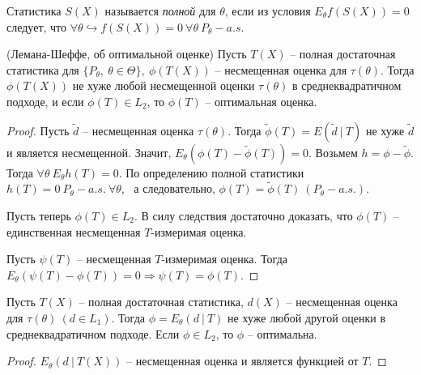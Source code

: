 \begin{definition}
    Статистика $S(X)$ называется \textit{полной} для $\theta$, если из условия $E_\theta f(S(X)) = 0$ следует, что $\forall \theta \hookrightarrow f(S(X)) = 0\ \forall \theta\ P_\theta-a.s.$
\end{definition}
\begin{theorem}
    (Лемана-Шеффе, об оптимальной оценке) Пусть $\displaystyle T( X)$ -- полная достаточная статистика для $\displaystyle \{P_{\theta } ,\ \theta \in \Theta \} ,\ \phi ( T( X))$ -- несмещенная оценка для $\displaystyle \tau ( \theta )$. Тогда $\displaystyle \phi ( T( X))$ не хуже любой несмещенной оценки $\displaystyle \tau ( \theta )$ в среднеквадратичном подходе, и если $\displaystyle \phi ( T) \in L_{2}$, то $\displaystyle \phi ( T)$ -- оптимальная оценка.
\end{theorem}
\begin{proof}
    Пусть $\displaystyle \tilde{d}$ -- несмещенная оценка $\displaystyle \tau ( \theta )$. Тогда $\displaystyle \tilde{\phi }( T) =E\left(\tilde{d} \ |\ T\right)$ не хуже $\displaystyle \tilde{d}$ и является несмещенной. Значит, $\displaystyle E_{\theta }\left( \phi ( T) -\tilde{\phi }( T)\right) =0$. Возьмем $\displaystyle h=\phi -\tilde{\phi }$. Тогда $\displaystyle \forall \theta \ E_{\theta } h( T) =0$. По определению полной статистики $\displaystyle h( T) =0\ P_{\theta } -a.s.\ \forall \theta $, \ а следовательно, $\displaystyle \phi ( T) =\tilde{\phi }( T) \ ( P_{\theta } -a.s.)$.
    
    Пусть теперь $\displaystyle \phi ( T) \in L_{2}$. В силу следствия достаточно доказать, что $\displaystyle \phi ( T)$ -- единственная несмещенная $\displaystyle T$-измеримая оценка.
    
    Пусть $\displaystyle \psi ( T)$ -- несмещенная $\displaystyle T$-измеримая оценка. Тогда $\displaystyle E_{\theta }( \psi ( T) -\phi ( T)) =0\Rightarrow \psi ( T) =\phi ( T)$.
\end{proof}
\begin{corollary}
    Пусть $\displaystyle T( X)$ -- полная достаточная статистика, $\displaystyle d( X)$ -- несмещенная оценка для $\displaystyle \tau ( \theta ) \ ( d\in L_{1})$. Тогда $\displaystyle \phi =E_{\theta }( d\ |\ T)$ не хуже любой другой оценки в среднеквадратичном подходе. Если $\displaystyle \phi \in L_{2}$, то $\displaystyle \phi $ -- оптимальна.
\end{corollary}
\begin{proof}
    $\displaystyle E_{\theta }( d\ |\ T( X))$ -- несмещенная оценка и является функцией от $\displaystyle T$.
\end{proof}
